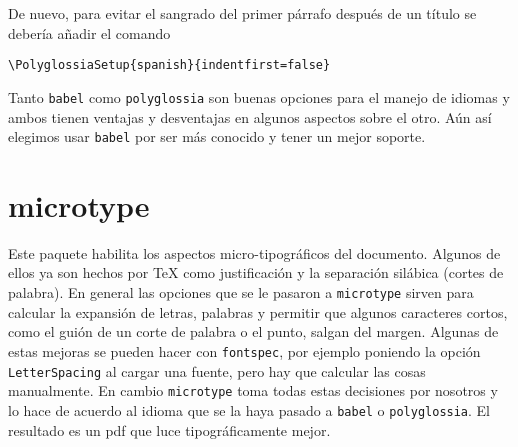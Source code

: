 De nuevo, para evitar el sangrado del primer párrafo después de un título
se debería añadir el comando
\begin{flushleft}
  \verb|\PolyglossiaSetup{spanish}{indentfirst=false}|
\end{flushleft}

Tanto \texttt{babel} como \texttt{polyglossia} son buenas opciones para el
manejo de idiomas y ambos tienen ventajas y desventajas en algunos aspectos
sobre el otro. Aún así elegimos usar \texttt{babel} por ser más conocido y tener un mejor soporte.


\section{microtype}
Este paquete habilita los aspectos micro-tipográficos del documento. Algunos
de ellos ya son hechos por \TeX{} como justificación y la separación
silábica (cortes de palabra). En general las opciones que se le pasaron a
\texttt{microtype} sirven para calcular la expansión de letras, palabras y
permitir que algunos caracteres cortos, como el guión de un corte de palabra o
el punto, salgan del margen. Algunas de estas mejoras se pueden hacer con
\texttt{fontspec}, por ejemplo poniendo la opción \texttt{LetterSpacing} al
cargar una fuente, pero hay que calcular las cosas manualmente. En cambio
\texttt{microtype} toma todas estas decisiones por nosotros y lo hace
de acuerdo al idioma que se la haya pasado a \texttt{babel} o
\texttt{polyglossia}. El resultado es un pdf que luce tipográficamente mejor.


